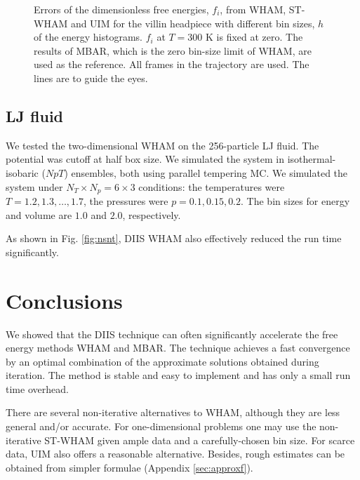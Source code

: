 \documentclass[reprint,aip,jcp,superscriptaddress]{revtex4-1}
\begin{document}
\begin{figure}[h]
  \caption{
    \label{fig:whamcmp}
    Errors of the dimensionless free energies, $f_i$,
    from WHAM, ST-WHAM and UIM
    for the villin headpiece
    with different bin sizes, $h$
    of the energy histograms.
    $f_i$ at $T = 300$ K is fixed at zero.
    The results of MBAR, which is
    the zero bin-size limit of WHAM,
    are used as the reference.
    All frames in the trajectory are used.
    The lines are to guide the eyes.
  }
\end{figure}




\subsection{\label{sec:results_LJ}
LJ fluid}


We tested the two-dimensional WHAM
on the 256-particle LJ fluid.
%
The potential was cutoff at half box size.
%
We simulated the system in isothermal-isobaric ($NpT$) ensembles,
both using parallel tempering MC.
%
We simulated the system
under $N_T \times N_p = 6\times 3$ conditions:
the temperatures were $T = 1.2, 1.3, \dots, 1.7$,
the pressures were $p = 0.1, 0.15, 0.2$.
%
The bin sizes for energy and volume
are $1.0$ and $2.0$, respectively.


As shown in Fig. \ref{fig:nsnt},
DIIS WHAM also effectively
reduced the run time significantly.





\section{Conclusions}



We showed that the DIIS technique
can often significantly accelerate
the free energy methods WHAM and MBAR.
%
The technique achieves a fast convergence
by an optimal combination of the approximate
solutions obtained during iteration.
%
The method is stable and easy to implement
and has only a small run time overhead.



There are several
non-iterative alternatives to WHAM,
although they are less general and/or accurate.
%
For one-dimensional problems
one may use
the non-iterative ST-WHAM
given ample data
and a carefully-chosen bin size.
%
For scarce data,
UIM also offers a reasonable alternative.
%
Besides,
rough estimates
can be obtained from simpler formulae
(Appendix \ref{sec:approxf}).
\end{document}
